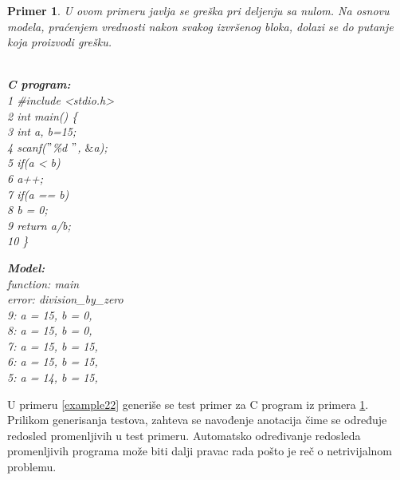 \documentclass[12pt,oneside]{memoir}
\newcommand\tab[1][0.5cm]{\hspace*{#1}}
\newtheorem{primer}{Primer}
\begin{document}
\begin{primer} \label{example21} U ovom primeru javlja se greška pri deljenju sa nulom. Na osnovu modela, praćenjem vrednosti nakon svakog izvršenog bloka, dolazi se do putanje koja proizvodi grešku.\\
\\
\hspace{-0.6cm}
\begin{minipage}[b]{0.5\textwidth}
\textbf{C program:}\\
1  \hspace{0.1cm} \#include <stdio.h> \\ 
2  \hspace{0.1cm} int main() \{ \\
3 	\hspace{0.1cm} \tab int a, b=15;\\
4	\hspace{0.1cm} \tab scanf($"$\%d $"$, $\&$a);\\
5	\hspace{0.1cm} \tab if(a < b)\\
6	\hspace{0.1cm} \tab \tab a++;\\
7	\hspace{0.1cm} \tab if(a == b)\\
8	\hspace{0.1cm} \tab \tab b = 0;\\
9	\hspace{0.1cm} \tab return a/b;\\ 
10 \hspace{0.1cm} \}

\end{minipage}
\hspace{0.3cm}
\begin{minipage}[t]{0.4\textwidth}
\vspace{-6.65cm}
\textbf{Model:}\\
function: main\\
error: division\_by\_zero\\
9: a = 15, b = 0,\\
8: a = 15, b = 0,\\
7: a = 15, b = 15,\\
6: a = 15, b = 15,\\
5: a = 14, b = 15,
\end{minipage}
\end{primer}

U primeru \ref{example22} generiše se test primer za C program iz primera \ref{example21}. Prilikom generisanja testova, zahteva se navođenje anotacija čime se određuje redosled promenljivih u test primeru. Automatsko određivanje redosleda promenljivih programa može biti dalji pravac rada pošto je reč o netrivijalnom problemu.
\end{document}
